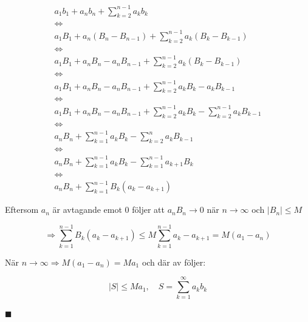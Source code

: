 \documentclass{article}
\begin{document}
\begin{equation*}
\begin{gathered}
    a_1 b_1 + a_n b_n + \sum_{k=2}^{n-1}a_k b_k\\
    \Leftrightarrow\\
    a_1 B_1 + a_n(B_n - B_{n-1}) + \sum_{k=2}^{n-1}a_k(B_k-B_{k-1})\\
    \Leftrightarrow\\
    a_1 B_1 + a_n B_n - a_n B_{n-1} + \sum_{k=2}^{n-1}a_k(B_k-B_{k-1})\\
    \Leftrightarrow\\
    a_1 B_1 + a_n B_n - a_n B_{n-1} + \sum_{k=2}^{n-1}a_k B_k - a_k B_{k-1}\\
    \Leftrightarrow\\
    a_1 B_1 + a_n B_n - a_n B_{n-1} + \sum_{k=2}^{n-1}a_k B_k - \sum_{k=2}^{n-1}a_k B_{k-1}\\
    \Leftrightarrow\\
    a_n B_n + \sum_{k=1}^{n-1}a_k B_k - \sum_{k=2}^{n}a_k B_{k-1}\\
    \Leftrightarrow\\
    a_n B_n + \sum_{k=1}^{n-1}a_k B_k - \sum_{k=1}^{n-1}a_{k+1} B_{k}\\
    \Leftrightarrow\\
    a_n B_n + \sum_{k=1}^{n-1}B_k(a_k-a_{k+1})
\end{gathered}
\end{equation*}

\noindent Eftersom $a_n$ är avtagande emot $0$ följer att $a_n B_n \rightarrow 0$ när $n \rightarrow \infty$ och $|B_n| \leq M$

\begin{equation*}
    \Rightarrow \sum_{k=1}^{n-1}B_k(a_k - a_{k+1}) \leq M \sum_{k=1}^{n-1}a_k - a_{k+1} = M(a_1 - a_{n})
\end{equation*}

\noindent När $n \rightarrow \infty \Rightarrow M(a_1 - a_n) = M a_1$ och där av följer:

\begin{equation*}
    |S| \leq M a_1, \quad S = \sum_{k=1}^{\infty}a_k b_k
\end{equation*}

\begin{flushright}
    $\blacksquare$
\end{flushright}
\end{document}
